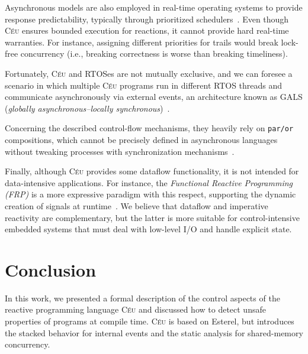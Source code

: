 \documentclass[preprint]{sigplanconf}
\newcommand{\CEU}{\textsc{C\'{e}u}\xspace}
\newcommand{\code}[1] {{\small{\texttt{#1}}}}
\newcommand{\1}{\;}
\newcommand{\2}{\;\;}
\newcommand{\3}{\;\;\;}
\newcommand{\5}{\;\;\;\;\;}
\begin{document}


Asynchronous models are also employed in real-time operating systems to provide 
response predictability, typically through prioritized 
schedulers~\cite{wsn.mantisos,wsn.oses,freertos}.
Even though \CEU ensures bounded execution for reactions, it cannot provide 
hard real-time warranties.
For instance, assigning different priorities for trails would break lock-free 
concurrency (i.e., breaking correctness is worse than breaking timeliness).

Fortunately, \CEU and RTOSes are not mutually exclusive, and we can foresee a 
scenario in which multiple \CEU programs run in different RTOS threads and 
communicate asynchronously via external events, an architecture known as GALS 
(\emph{globally asynchronous--locally synchronous})~\cite{rp.gals}.

Concerning the described control-flow mechanisms, they heavily rely on 
\code{par/or} compositions, which cannot be precisely defined in asynchronous 
languages without tweaking processes with synchronization 
mechanisms~\cite{esterel.preemption}.

Finally, although \CEU provides some dataflow functionality, it is not intended 
for data-intensive applications.
For instance, the \emph{Functional Reactive Programming (FRP)} is a more 
expressive paradigm with this respect, supporting the dynamic creation of 
signals at runtime~\cite{frp.principles}.
We believe that dataflow and imperative reactivity are complementary, but the 
latter is more suitable for control-intensive embedded systems that must deal 
with low-level I/O and handle explicit state.

\section{Conclusion}
\label{sec.conclusion}

In this work, we presented a formal description of the control aspects of the 
reactive programming language \CEU and discussed how to detect unsafe 
properties of programs at compile time.
\CEU is based on Esterel, but introduces the stacked behavior for internal 
events and the static analysis for shared-memory concurrency.
\end{document}
